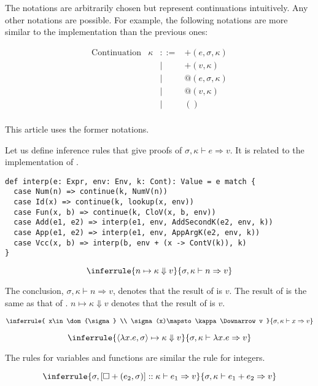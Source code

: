 The notations are arbitrarily chosen but represent continuations intuitively. Any
other notations are possible. For example, the following notations are more
similar to the implementation than the previous ones:

\[
\begin{array}{lrcl}
\text{Continuation} & \kappa & ::= & +(e,\sigma,\kappa) \\
&&|& +(v,\kappa) \\
&&|& @(e,\sigma,\kappa) \\
&&|& @(v,\kappa) \\
&&|& () \\
\end{array}
\]

This article uses the former notations.

Let us define inference rules that give proofs of $\sigma,\kappa\vdash
e\Rightarrow v$. It is related to the implementation of .

\begin{verbatim}
def interp(e: Expr, env: Env, k: Cont): Value = e match {
  case Num(n) => continue(k, NumV(n))
  case Id(x) => continue(k, lookup(x, env))
  case Fun(x, b) => continue(k, CloV(x, b, env))
  case Add(e1, e2) => interp(e1, env, AddSecondK(e2, env, k))
  case App(e1, e2) => interp(e1, env, AppArgK(e2, env, k))
  case Vcc(x, b) => interp(b, env + (x -> ContV(k)), k)
}
\end{verbatim}

\[
\inferrule
{ n\mapsto\kappa\Downarrow v }
{ \sigma,\kappa\vdash n\Rightarrow v }
\]

The conclusion, $\sigma,\kappa\vdash n\Rightarrow v$, denotes that the result of
 is $v$. The result of  is the same as that of .
$n\mapsto\kappa\Downarrow v$ denotes that the result of  is $v$.

\[
\inferrule
{ x\in\dom{\sigma} \\ \sigma(x)\mapsto\kappa\Downarrow v }
{ \sigma,\kappa\vdash x\Rightarrow v }
\]

\[
\inferrule
{ \langle\lambda x.e,\sigma\rangle\mapsto\kappa\Downarrow v }
{ \sigma,\kappa\vdash \lambda x.e\Rightarrow v }
\]

The rules for variables and functions are similar the rule for integers.

\[
\inferrule
{ \sigma,[\square+(e_2,\sigma)]::\kappa\vdash e_1\Rightarrow v }
{ \sigma,\kappa\vdash e_1+e_2\Rightarrow v }
\]

